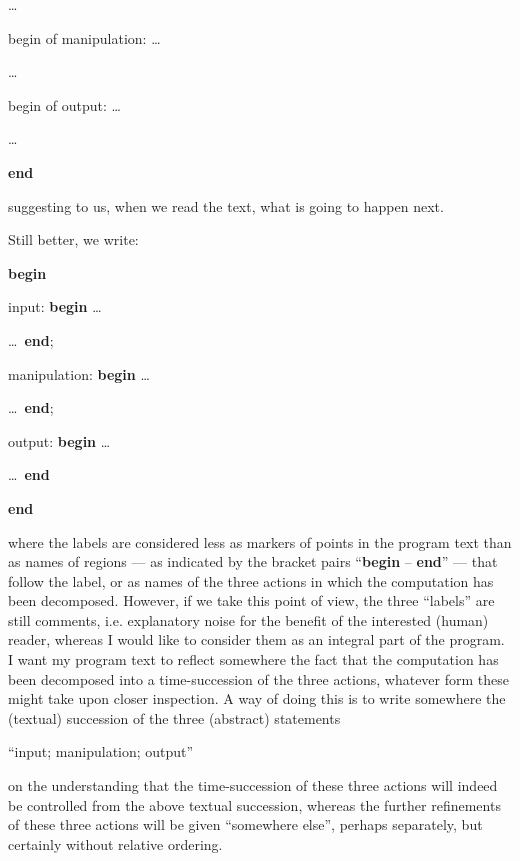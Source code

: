 \noindent
\tabto{10em} \quad\dots

\noindent
begin of manipulation:\tabto{10em} \quad\dots
\nopagebreak

\noindent
\tabto{10em} \quad\dots

\noindent
begin of output:\tabto{10em} \quad\dots
\nopagebreak

\noindent
\tabto{10em} \quad\dots

\noindent
\tabto{10em}\textbf{end}

\noindent
suggesting to us, when we read the text, what is going to happen next.

Still better, we write:

\noindent
\tabto{10em}\textbf{begin}
\nopagebreak

\noindent
input:\tabto{10em} \quad\textbf{begin} \tabto{14em}\dots
\nopagebreak

\noindent
\tabto{13em} \quad\dots\ \textbf{end};

\noindent
manipulation:\tabto{10em} \quad\textbf{begin} \tabto{14em}\dots
\nopagebreak

\noindent
\tabto{13em} \quad\dots\ \textbf{end};

\noindent
output:\tabto{10em} \quad\textbf{begin} \tabto{14em}\dots
\nopagebreak

\noindent
\tabto{13em} \quad\dots\ \textbf{end}

\noindent
\tabto{10em}\textbf{end}

\noindent
where the labels are considered less as markers of points in the program text than as names of regions --- as indicated by the bracket pairs ``\textbf{begin} -- \textbf{end}'' --- that follow the label, or as names of the three actions in which the computation has been decomposed. However, if we take this point of view, the three ``labels'' are still comments, i.e. explanatory noise for the benefit of the interested (human) reader, whereas I would like to consider them as an integral part of the program. I want my program text to reflect somewhere the fact that the computation has been decomposed into a time-succession of the three actions, whatever form these might take upon closer inspection. A way of doing this is to write somewhere the (textual) succession of the three (abstract) statements
\medskip

{
	\setlength{\parindent}{8em}
	\hspace{-.5em}``input; manipulation; output''
}
\medskip

\noindent
on the understanding that the time-succession of these three actions will indeed be controlled from the above textual succession, whereas the further refinements of these three actions will be given ``somewhere else'', perhaps separately, but certainly without relative ordering.

